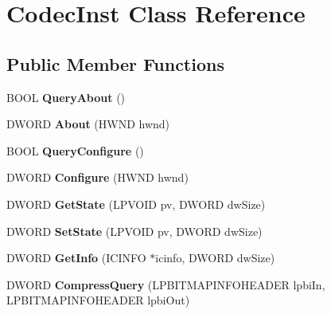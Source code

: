 \hypertarget{classCodecInst}{\section{Codec\-Inst Class Reference}
\label{classCodecInst}
}
\subsection*{Public Member Functions}
\begin{DoxyCompactItemize}
\item 
\hypertarget{classCodecInst_a11ea48256986c2bad15781e45bb69265}{B\-O\-O\-L {\bfseries Query\-About} ()}\label{classCodecInst_a11ea48256986c2bad15781e45bb69265}

\item 
\hypertarget{classCodecInst_aa81f93659f587c77d8038bb3109e9eac}{D\-W\-O\-R\-D {\bfseries About} (H\-W\-N\-D hwnd)}\label{classCodecInst_aa81f93659f587c77d8038bb3109e9eac}

\item 
\hypertarget{classCodecInst_a5a025a80e53b9ea96884b29f352b1500}{B\-O\-O\-L {\bfseries Query\-Configure} ()}\label{classCodecInst_a5a025a80e53b9ea96884b29f352b1500}

\item 
\hypertarget{classCodecInst_a60f45fd64e7d67f798eebdfd5d10e238}{D\-W\-O\-R\-D {\bfseries Configure} (H\-W\-N\-D hwnd)}\label{classCodecInst_a60f45fd64e7d67f798eebdfd5d10e238}

\item 
\hypertarget{classCodecInst_a40524b294af71d58e10c805dd89939e7}{D\-W\-O\-R\-D {\bfseries Get\-State} (L\-P\-V\-O\-I\-D pv, D\-W\-O\-R\-D dw\-Size)}\label{classCodecInst_a40524b294af71d58e10c805dd89939e7}

\item 
\hypertarget{classCodecInst_a4bd50febda7bad2b93e3069114998e49}{D\-W\-O\-R\-D {\bfseries Set\-State} (L\-P\-V\-O\-I\-D pv, D\-W\-O\-R\-D dw\-Size)}\label{classCodecInst_a4bd50febda7bad2b93e3069114998e49}

\item 
\hypertarget{classCodecInst_aee5c558973a1479361113000c2bf9252}{D\-W\-O\-R\-D {\bfseries Get\-Info} (I\-C\-I\-N\-F\-O $\ast$icinfo, D\-W\-O\-R\-D dw\-Size)}\label{classCodecInst_aee5c558973a1479361113000c2bf9252}

\item 
\hypertarget{classCodecInst_aaf955478b912b7e0f607e437fd8ea697}{D\-W\-O\-R\-D {\bfseries Compress\-Query} (L\-P\-B\-I\-T\-M\-A\-P\-I\-N\-F\-O\-H\-E\-A\-D\-E\-R lpbi\-In, L\-P\-B\-I\-T\-M\-A\-P\-I\-N\-F\-O\-H\-E\-A\-D\-E\-R lpbi\-Out)}\label{classCodecInst_aaf955478b912b7e0f607e437fd8ea697}


\end{DoxyCompactItemize}
